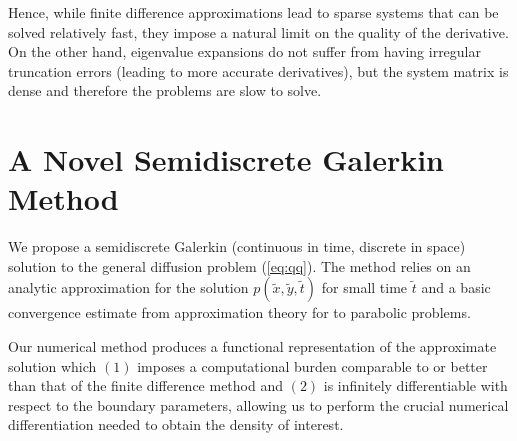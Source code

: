 Hence, while finite difference approximations lead to sparse systems
that can be solved relatively fast, they impose a natural limit on the
quality of the derivative. On the other hand, eigenvalue expansions do
not suffer from having irregular truncation errors (leading to more
accurate derivatives), but the system matrix is dense and therefore
the problems are slow to solve.



\section{A Novel Semidiscrete Galerkin
  Method} \label{sec:semidiscrete-galerkin} We propose a semidiscrete
Galerkin (continuous in time, discrete in space) solution to the
general diffusion problem (\ref{eq:qq}). The method relies on an
analytic approximation for the solution
$p(\tilde{x},\tilde{y},\tilde{t})$ for small time $\tilde{t}$ and a
basic convergence estimate from approximation theory for to parabolic
problems.

Our numerical method produces a functional representation of the
approximate solution which $(1)$ imposes a computational burden
comparable to or better than that of the finite difference method and
$(2)$ is infinitely differentiable with respect to the boundary
parameters, allowing us to perform the crucial numerical
differentiation needed to obtain the density of interest.

